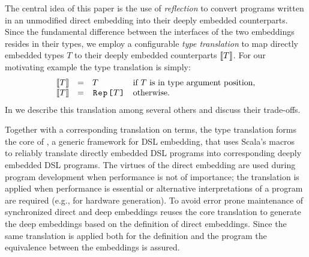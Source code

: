 The central idea of this paper is the use of \emph{reflection} to convert
programs written in an unmodified direct embedding into their deeply
embedded counterparts.  Since the fundamental difference between the
interfaces of the two embeddings resides in their types, we employ a
configurable \emph{type translation} to map directly embedded
types $T$ to their deeply embedded counterparts $\llbracket T \rrbracket$. For our
motivating example the type translation is simply:
\[
\begin{array}{llll}
  \ttrone{T} &=& T   & \text{if $T$ is in type argument position,}  \\
  \ttrone{T} &=& \text{\code{Rep[}}T\text{\code{]}}& \text{otherwise}.
\end{array}
\]
In  we describe this translation among several
others and discuss their trade-offs.

Together with a corresponding translation on terms, the type
translation forms the core of \tool, a generic framework for DSL
embedding, that uses Scala's macros~\cite{burmako_scala_2013} to
reliably translate directly embedded DSL programs into corresponding
deeply embedded DSL programs.  The virtues of the direct embedding are
used during program development when performance is not of importance;
the translation is applied when performance is essential or
alternative interpretations of a program are required (e.g., for
hardware generation).  To avoid error prone maintenance of
synchronized direct and deep embeddings \tool reuses the core
translation to generate the deep embeddings based on the definition of
direct embeddings. Since the same translation is applied both for the
\edsl definition and the \edsl program the equivalence between the
embeddings is assured.

